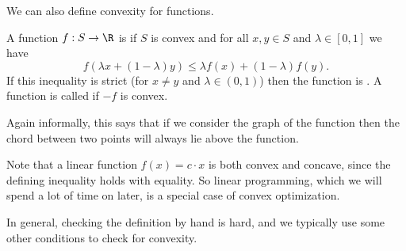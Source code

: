 \documentclass[a4paper]{scrartcl}
\begin{document}
We can also define convexity for functions.

\begin{definition}
    A function $f: S \rightarrow \R$ is  if $S$ is convex and for all $x, y \in S$ and $\lambda \in [0, 1]$ we have
    $$
    f(\lambda x + (1 - \lambda) y) \leq \lambda f(x) + (1 - \lambda) f(y).
    $$
    If this inequality is strict (for $x \neq y$ and $\lambda \in (0,1)$) then the function is . A function is called  if $-f$ is convex.
\end{definition}

Again informally, this says that if we consider the graph of the function then the chord between two points will always lie above the function.

\begin{center}
\end{center}

Note that a linear function $f(x) = c \cdot x$ is both convex and concave, since the defining inequality holds with equality. So linear programming, which we will spend a lot of time on later, is a special case of convex optimization.

In general, checking the definition by hand is hard, and we typically use some other conditions to check for convexity.
\end{document}
